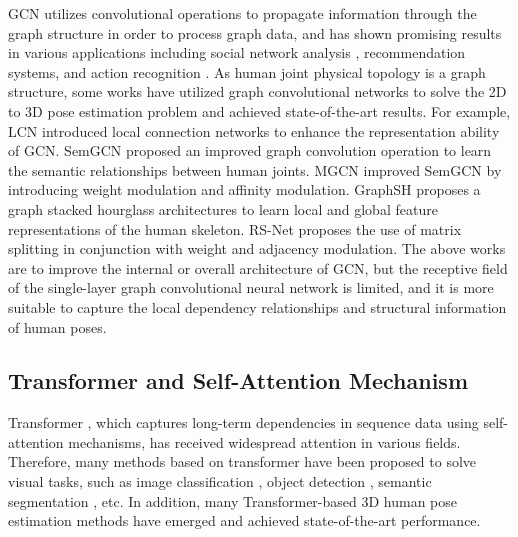 \documentclass[journal]{IEEEtran}
\begin{document}
GCN \cite{kipf2016semi} utilizes convolutional operations to propagate information through the graph structure in order to process graph data, and has shown promising results in various applications including social network analysis \cite{wu2018socialgcn}, recommendation systems, and action recognition \cite{yan2018spatial,zhang2019graph,chen2021channel}. As human joint physical topology is a graph structure, some works have utilized graph convolutional networks to solve the 2D to 3D pose estimation problem and achieved state-of-the-art results. For example, LCN \cite{ci2019optimizing} introduced local connection networks to enhance the representation ability of GCN. SemGCN \cite{zhao2019semantic} proposed an improved graph convolution operation to learn the semantic relationships between human joints. MGCN \cite{zou2021modulated} improved SemGCN by introducing weight modulation and affinity modulation. GraphSH\cite{xu2021graph} proposes a  graph stacked hourglass  architectures to learn local and global feature representations of the human skeleton. RS-Net\cite{hassan2023regular} proposes the use of matrix splitting in conjunction with weight and adjacency modulation. The above works are to improve the internal or overall architecture of GCN, but the receptive field of the single-layer graph convolutional neural network is limited, and it is more suitable to capture the local dependency relationships and structural information of human poses.







\subsection{Transformer and Self-Attention Mechanism}



Transformer \cite{vaswani2017attention}, which captures long-term dependencies in sequence data using self-attention mechanisms, has received widespread attention in various fields. Therefore, many methods based on transformer have been proposed to solve visual tasks, such as image classification \cite{dosovitskiy2020image}, object detection \cite{carion2020end}, semantic segmentation \cite{zheng2021rethinking}, etc. In addition, many Transformer-based 3D human pose estimation methods \cite{zheng20213d,zhang2022mixste,shan2022p,zhao2023poseformerv2} have emerged and achieved state-of-the-art performance. 
\end{document}

